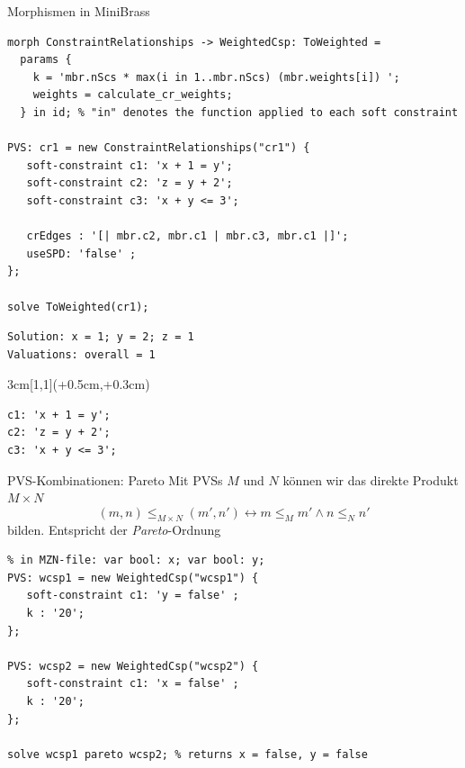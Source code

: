 \begin{frame}[fragile]{Morphismen in MiniBrass}
\begin{lstlisting}
morph ConstraintRelationships -> WeightedCsp: ToWeighted = 
  params {
    k = 'mbr.nScs * max(i in 1..mbr.nScs) (mbr.weights[i]) ';
    weights = calculate_cr_weights;
  } in id; % "in" denotes the function applied to each soft constraint 
   
PVS: cr1 = new ConstraintRelationships("cr1") {
   soft-constraint c1: 'x + 1 = y';
   soft-constraint c2: 'z = y + 2';
   soft-constraint c3: 'x + y <= 3';
   
   crEdges : '[| mbr.c2, mbr.c1 | mbr.c3, mbr.c1 |]';
   useSPD: 'false' ;
}; 

solve ToWeighted(cr1);
\end{lstlisting}
\begin{Verbatim}[fontsize=\small]
Solution: x = 1; y = 2; z = 1
Valuations: overall = 1
\end{Verbatim}
\begin{textblock*}{3cm}[1,1](\textwidth+0.5cm,\textheight+0.3cm)
\begin{center}
\begin{Verbatim}[fontsize=\small]
c1: 'x + 1 = y';
c2: 'z = y + 2';
c3: 'x + y <= 3';   
\end{Verbatim}

\end{center}
\end{textblock*}

\end{frame}

\begin{frame}[fragile]{PVS-Kombinationen: Pareto} \small
Mit PVSs $M$ und $N$ können wir das direkte Produkt $M \times N$ 
\[
(m, n) \leq_{M \times N} (m', n') \leftrightarrow m \leq_M m' \wedge n \leq_N n'
\]
bilden. Entspricht der \emph{Pareto}-Ordnung
\begin{lstlisting}
% in MZN-file: var bool: x; var bool: y;
PVS: wcsp1 = new WeightedCsp("wcsp1") {
   soft-constraint c1: 'y = false' ;
   k : '20';
}; 

PVS: wcsp2 = new WeightedCsp("wcsp2") {
   soft-constraint c1: 'x = false' ;
   k : '20';
}; 

solve wcsp1 pareto wcsp2; % returns x = false, y = false
\end{lstlisting}
\end{frame}

